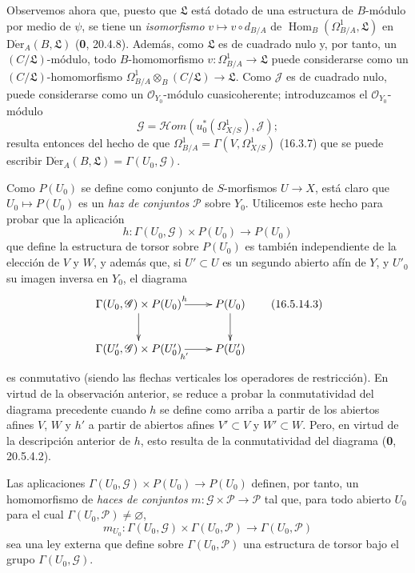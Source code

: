 \begin{env}[16.5.14]
Observemos ahora que, puesto que $\mathfrak{L}$ está dotado de una estructura de
$B$-módulo por medio de $\psi$, se tiene un \emph{isomorfismo}
$v\mapsto v\circ d_{B/A}$ de
$\operatorname{Hom}_B(\Omega_{B/A}^1,\mathfrak{L})$ en
$\operatorname{D\acute{e}r}_A(B,\mathfrak{L})$ (\textbf 0, 20.4.8). Además, como
$\mathfrak{L}$ es de cuadrado nulo y, por tanto, un $(C/\mathfrak{L})$-módulo, todo
$B$-homomorfismo $v:\Omega_{B/A}^1\to\mathfrak{L}$ puede considerarse
como un $(C/\mathfrak{L})$-homomorfismo
$\Omega_{B/A}^1\otimes_B(C/\mathfrak{L})\to\mathfrak{L}$. Como
$\mathscr{J}$ es de cuadrado nulo, puede considerarse como un
$\mathcal{O}_{Y_0}$-módulo cuasicoherente; introduzcamos el
$\mathcal{O}_{Y_0}$-módulo
\[
  \mathscr{G}=\mathscr{H}om(u_0^*(\varOmega_{X/S}^1),\mathscr{J});
  \tag{16.5.14.2}
  \label{IV.16.5.14.2}
\]
resulta entonces del hecho de que
$\Omega_{B/A}^1=\Gamma(V,\varOmega_{X/S}^1)$ (16.3.7) que se puede escribir
$\operatorname{D\acute{e}r}_A(B,\mathfrak{L})=\Gamma(U_0,\mathscr{G})$.

Como $P(U_0)$ se define como conjunto de $S$-morfismos $U\to X$, está
claro que $U_0\mapsto P(U_0)$ es un \emph{haz de conjuntos}
$\mathscr{P}$ sobre $Y_0$. Utilicemos este hecho para probar que la aplicación
\[
  h:\Gamma(U_0,\mathscr{G})\times P(U_0)\longrightarrow P(U_0)
\]
que define la estructura de torsor sobre $P(U_0)$ es también independiente de la
elección de $V$ y $W$, y además que, si $U'\subset U$ es un segundo abierto
afín de $Y$, y $U'_0$ su imagen inversa en $Y_0$, el diagrama
\[
  \xymatrix{
    \Gamma(U_0,\mathscr{G})\times P(U_0)\ar[d]\ar[r]^h
      & P(U_0)\ar[d]\\
    \Gamma(U'_0,\mathscr{G})\times P(U'_0)\ar[r]_{h'}
      & P(U'_0)
  }
  \tag{16.5.14.3}
  \label{IV.16.5.14.3}
\]
es conmutativo (siendo las flechas verticales los operadores de restricción).
En virtud de la observación anterior, se reduce a probar la conmutatividad
del diagrama precedente cuando $h$ se define como arriba a partir de los
abiertos afines $V$, $W$ y $h'$ a partir de abiertos
afines $V'\subset V$ y $W'\subset W$. Pero, en virtud de la descripción
anterior de $h$, esto resulta de la conmutatividad del diagrama (\textbf 0, 20.5.4.2).

Las aplicaciones
$\Gamma(U_0,\mathscr{G})\times P(U_0)\to P(U_0)$ definen, por tanto, un
homomorfismo de \emph{haces de conjuntos}
$m:\mathscr{G}\times\mathscr{P}\to\mathscr{P}$ tal que, para todo abierto
$U_0$ para el cual $\Gamma(U_0,\mathscr{P})\neq\varnothing$,
\[
  m_{U_0}:\Gamma(U_0,\mathscr{G})\times\Gamma(U_0,\mathscr{P})
  \longrightarrow\Gamma(U_0,\mathscr{P})
\]
sea una ley externa que define sobre $\Gamma(U_0,\mathscr{P})$ una estructura
de torsor bajo el grupo $\Gamma(U_0,\mathscr{G})$.
\end{env}

